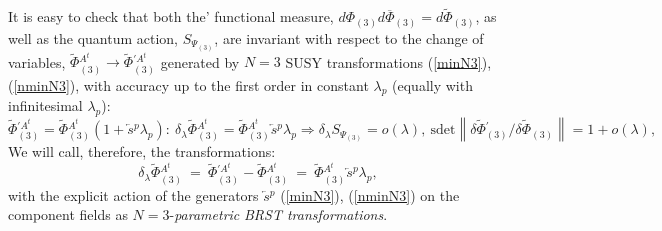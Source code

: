 \documentclass[10pt]{article}
\begin{document}
 It is easy  to check that both the' functional measure, $d \Phi_{(3)} d \overline{\Phi}_{(3)}= d\widetilde{\Phi}_{(3)}$, as well as the quantum action,
 $S_{\Psi_{(3)}}$, are invariant with respect to the change of variables, $\widetilde{\Phi}{}^{A^t}_{(3)}\to  \widetilde{\Phi}{}^{\prime  A^t}_{(3)}$ generated by  $N=3$ SUSY transformations (\ref{minN3}), (\ref{nminN3}), with accuracy   up to the first order in constant $\lambda_p$  (equally with infinitesimal  $\lambda_p$):
\begin{equation}\label{N3inv}
 \widetilde{\Phi}{}^{\prime  A^t}_{(3)}=\widetilde{\Phi}{}^{A^t}_{(3)}(1+\overleftarrow{s}{}^p\lambda_p): \ \delta_{\lambda}\widetilde{\Phi}{}^{  A^t}_{(3)}=\widetilde{\Phi}{}^{  A^t}_{(3)}\overleftarrow{s}{}^p\lambda_p \Longrightarrow    \delta_{\lambda}S_{\Psi_{(3)}} =o(\lambda), \ \mathrm{sdet}\left\| \delta\widetilde{\Phi}{}^{\prime}_{(3)}/  \delta\widetilde{\Phi}_{(3)}  \right\| =1+o(\lambda),
\end{equation}
 We will call, therefore, the transformations:
 \begin{equation}\label{n3brst}
   \delta_{\lambda}\widetilde{\Phi}{}^{  A^t}_{(3)}\ = \ \widetilde{\Phi}{}^{\prime  A^t}_{(3)}-\widetilde{\Phi}{}^{  A^t}_{(3)}\ = \ \widetilde{\Phi}{}^{  A^t}_{(3)}\overleftarrow{s}{}^p\lambda_p,\
 \end{equation}
 with the explicit action of the generators $\overleftarrow{s}{}^p$ (\ref{minN3}), (\ref{nminN3}) on  the component fields as $N=3$-\emph{parametric}  \emph{BRST transformations}.
\end{document}
